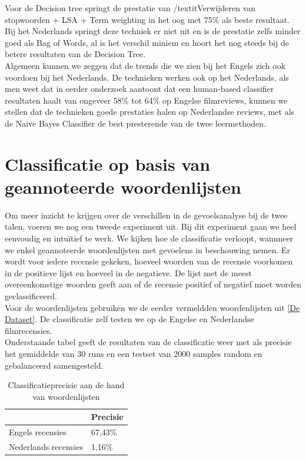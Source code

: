 Voor de Decision tree springt de prestatie van /textit{Verwijderen van stopwoorden $+$ LSA + Term weighting} in het oog met 75\% als beste resultaat. Bij het Nederlands springt deze techniek er niet uit en is de prestatie zelfs minder goed als Bag of Words, al is het verschil miniem en hoort het nog steeds bij de betere resultaten van de Decision Tree.\\

Algemeen kunnen we zeggen dat de trends die we zien bij het Engels zich ook voordoen bij het Nederlands. De technieken werken ook op het Nederlands, als men weet dat in eerder onderzoek \cite{pang2002thumbs} aantoont dat een human-based classifier resultaten haalt van ongeveer 58\% tot 64\% op Engelse filmreviews, kunnen we stellen dat de technieken goede prestaties halen op Nederlandse reviews, met als de Naive Bayes Classifier de best presterende van de twee leermethoden.


\section{Classificatie op basis van geannoteerde woordenlijsten}\label{Classificatie op basis van geannoteerde woordenlijsten}


Om meer inzicht te krijgen over de verschillen in de gevoelsanalyse bij de twee talen, voeren we nog een tweede experiment uit. Bij dit experiment gaan we heel eenvoudig en intu\"itief te werk. We kijken hoe de classificatie verloopt, wannneer we enkel geannoteerde woordenlijsten met gevoelens in beschouwing nemen. Er wordt voor iedere recensie gekeken, hoeveel woorden van de recensie voorkomen in de positieve lijst en hoeveel in de negatieve. De lijst met de meest overeenkomstige woorden geeft aan of de recensie positief of negatief moet worden geclassificeerd.\\
Voor de woordenlijsten gebruiken we de eerder vermeldden woordenlijsten uit \ref{De Dataset}. De classificatie zelf testen we op de Engelse en Nederlandse filmrecensies.\\
Onderstaande tabel geeft de resultaten van de classificatie weer met als precisie het gemiddelde van 30 runs en een testset van 2000 samples random en gebalanceerd samengesteld.

\begin{table}[h]
\centering
\label{my-label}
\begin{tabular}{l|l|}
\cline{2-2}
                                           & Precisie \\ \hline
\multicolumn{1}{|l|}{Engels recensies}     & 67,43\%  \\ \hline
\multicolumn{1}{|l|}{Nederlands recensies} & 1,16\%   \\ \hline
\end{tabular}
\caption{Classificatieprecisie aan de hand van woordenlijsten}
\end{table}



